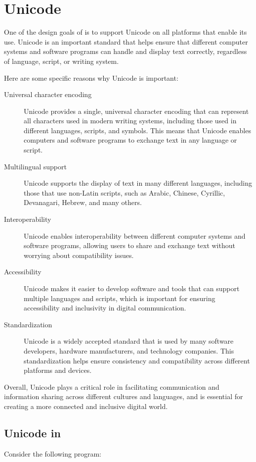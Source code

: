 \chapter{Unicode}
One of the design goals of \crexx{} is to support Unicode on all
platforms that enable its use. 
Unicode is an important standard that helps ensure that different computer systems and software programs can handle and display text correctly, regardless of language, script, or writing system.

Here are some specific reasons why Unicode is important:
\begin{description}
\item[Universal character encoding] Unicode provides a single, universal character encoding that can represent all characters used in modern writing systems, including those used in different languages, scripts, and symbols. This means that Unicode enables computers and software programs to exchange text in any language or script.
\item[Multilingual support] Unicode supports the display of text in many different languages, including those that use non-Latin scripts, such as Arabic, Chinese, Cyrillic, Devanagari, Hebrew, and many others.
\item[Interoperability] Unicode enables interoperability between different computer systems and software programs, allowing users to share and exchange text without worrying about compatibility issues.
\item[Accessibility] Unicode makes it easier to develop software and tools that can support multiple languages and scripts, which is important for ensuring accessibility and inclusivity in digital communication.
\item[Standardization] Unicode is a widely accepted standard that is
  used by many software developers, hardware manufacturers, and
  technology companies. This standardization helps ensure consistency
  and compatibility across different platforms and devices.
\end{description}
Overall, Unicode plays a critical role in facilitating communication
and information sharing across different cultures and languages, and
is essential for creating a more connected and inclusive digital
world.

\section{Unicode in \crexx{}}
Consider the following program:
